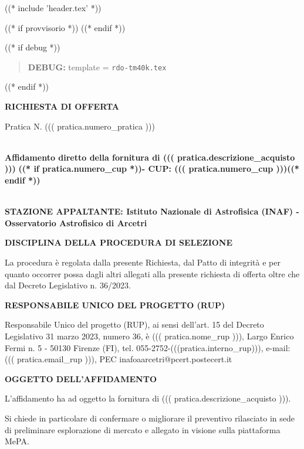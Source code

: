 
((* include 'header.tex' *))

((* if provvisorio *))
((* endif *))



\topaddr

((* if debug *))
\begin{quotation}
	\textbf{DEBUG:} template = \texttt{rdo-tm40k.tex}
\end{quotation}
((* endif *))

\begin{center}
\textbf{RICHIESTA DI OFFERTA}
\end{center}

Pratica N. ((( pratica.numero_pratica )))


~\\
\textbf{Affidamento diretto della fornitura di ((( pratica.descrizione_acquisto )))}
\textbf{((* if pratica.numero_cup *))- CUP: ((( pratica.numero_cup )))((* endif *))}


~\\
\textbf{STAZIONE APPALTANTE: Istituto Nazionale di Astrofisica (INAF) - Osservatorio Astrofisico di Arcetri}

\textbf{DISCIPLINA DELLA PROCEDURA DI SELEZIONE}

La procedura è regolata dalla presente Richiesta, dal Patto di integrità
e per quanto occorrer possa dagli altri allegati alla presente richiesta
di offerta oltre che dal Decreto Legislativo n. 36/2023.


\textbf{RESPONSABILE UNICO DEL PROGETTO (RUP)}

Responsabile Unico del progetto (RUP), ai sensi dell'art. 15 del
Decreto Legislativo 31 marzo 2023, numero 36, è
 ((( pratica.nome_rup ))), Largo Enrico Fermi n. 5 - 50130 Firenze
 (FI), tel. 055-2752-(((pratica.interno_rup))),
e-mail: ((( pratica.email_rup ))), PEC inafoaarcetri@pcert.postecert.it


\textbf{OGGETTO DELL'AFFIDAMENTO}

L'affidamento ha ad oggetto la fornitura di  ((( pratica.descrizione_acquisto ))).

Si chiede in particolare di confermare o migliorare il preventivo
rilasciato in sede di preliminare esplorazione di mercato e allegato in
visione sulla piattaforma MePA.

